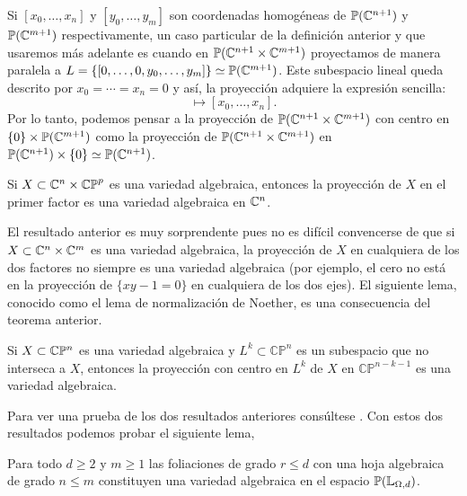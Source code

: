 \begin{Ejemplo}
\label{Ej:ProyeccionCanonica}
Si $[x_{0},\ldots,x_{n}]$ y $[y_{0},\ldots,y_{m}]$ son coordenadas homogéneas de $\mathbb{P}(\mathbb{C}^{n+1})$ y $\mathbb{P}(\mathbb{C}^{m+1})$ respectivamente, un caso particular de la definición anterior y que usaremos más adelante es cuando en $\mathbb{P}(\mathbb{C}^{n+1}\times\mathbb{C}^{m+1})$ proyectamos de manera paralela a $L=\{ [0,\ldots,0,y_{0},\ldots,y_{m}] \}\simeq\mathbb{P}(\mathbb{C}^{m+1})$. Este subespacio lineal queda descrito por $x_{0}=\cdots=x_{n}=0$ y así, la proyección adquiere la expresión sencilla:
\begin{equation*}
[x_{0},\ldots,x_{n},y_{0},\ldots,y_{m}]\mapsto [x_{0},\ldots,x_{n}].
\end{equation*}
Por lo tanto, podemos pensar a la proyección de $\mathbb{P}(\mathbb{C}^{n+1}\times\mathbb{C}^{m+1})$ con centro en $\{0\}\times\mathbb{P}(\mathbb{C}^{m+1})$ como la proyección de $\mathbb{P}(\mathbb{C}^{n+1}\times\mathbb{C}^{m+1})$ en $\mathbb{P}(\mathbb{C}^{n+1})\times\{0\}\simeq\mathbb{P}(\mathbb{C}^{n+1})$.  
\end{Ejemplo}

\begin{Teorema}
\label{Teo:CompacidadProyectiva}
Si $X\subset\mathbb{C}^{n}\times\mathbb{CP}^{p}$ es una variedad algebraica, entonces la proyección de $X$ en el primer factor es una variedad algebraica en $\mathbb{C}^{n}$.
\end{Teorema}

El resultado anterior es muy sorprendente pues no es difícil convencerse de que si $X\subset\mathbb{C}^{n}\times\mathbb{C}^{m}$ es una variedad algebraica, la proyección de $X$ en cualquiera de los dos factores no siempre es una variedad algebraica (por ejemplo, el cero no está en la proyección de $\{xy-1=0\}$ en cualquiera de los dos ejes). El siguiente lema, conocido como el lema de normalización de Noether, es una consecuencia del teorema anterior.

\begin{Lema}
\label{Lema:NormalizacionDeNoether}
Si $X\subset\mathbb{C}\mathbb{P}^{n}$ es una variedad algebraica y $L^{k}\subset\mathbb{CP}^{n  }$ es un subespacio que no interseca a $X$, entonces la proyección con centro en $L^{k}$ de $X$ en $\mathbb{CP}^{n-k-1}$ es una variedad algebraica. 
\end{Lema}

Para ver una prueba de los dos resultados anteriores consúltese \cite{Mumford}. Con estos dos resultados podemos probar el siguiente lema,

\begin{Lema}
\label{Lema:ConjuntoAlgebraico}
Para todo $d\geq 2$ y $m\geq 1$ las foliaciones de grado $r\leq d$ con una hoja algebraica de grado $n\leq m$ constituyen una variedad algebraica en el espacio $\mathbb{P}(\mathbb{L}_{\Omega,d})$.
\end{Lema}

